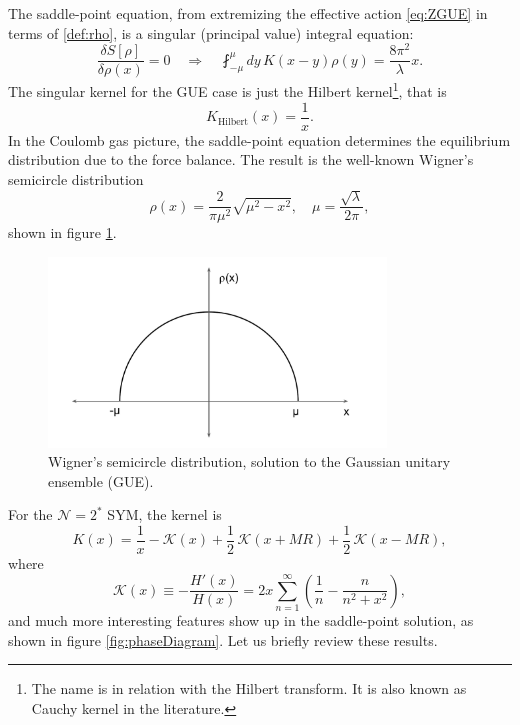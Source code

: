 The saddle-point equation, from extremizing the effective action \eqref{eq:ZGUE} in terms of \eqref{def:rho}, 
is a singular (principal value) integral equation:
\begin{equation} \label{saddlepointEq}
 \dfrac{\delta S [\rho]}{\delta \rho(x)} = 0 \quad
 \Rightarrow \quad
 \fint_{-\mu}^\mu dy \, K(x-y) \rho(y) = \dfrac{8\pi^2}{\lambda}x.
\end{equation}
The singular kernel for the GUE case is just the Hilbert kernel\footnote{
The name is in relation with the Hilbert transform. 
It is also known as Cauchy kernel in the literature.},
that is 
\begin{equation}
 K_\text{Hilbert}(x)=\dfrac{1}{x}.
\end{equation}
In the Coulomb gas picture, the saddle-point equation determines the equilibrium distribution due to the force balance.
The result is the well-known Wigner's semicircle distribution
\begin{equation}\label{semicircle}
 \rho(x) = \dfrac{2}{\pi \mu^2} \sqrt{\mu^2-x^2}, 
 \quad \mu = \dfrac{\sqrt{\lambda}}{2\pi},
\end{equation}
shown in figure \ref{fig:semicircle}.


\begin{figure}[t]
\begin{center}
 \centerline{\includegraphics[width=0.8\textwidth]{Images/semicircle.pdf}}
 \caption{\label{fig:semicircle} Wigner's semicircle distribution, solution to the Gaussian unitary ensemble (GUE).}
\end{center}
\end{figure}

For the $\mathcal{N}=2^*$ SYM, the kernel is
\begin{equation}
 K(x)=\dfrac{1}{x}-\mathcal{K}(x)+\dfrac{1}{2}\,\mathcal{K}(x+MR)+\dfrac{1}{2}\,\mathcal{K}(x-MR),
\end{equation}
where 
\begin{equation}
 \mathcal{K}(x) \equiv -\dfrac{H'(x)}{H(x)} 
                = 2x\sum_{n=1}^{\infty} \left(\dfrac{1}{n}-\dfrac{n}{n^2+x^2} \right),
\end{equation}
and much more interesting features show up in the saddle-point solution, as shown in figure \ref{fig:phaseDiagram}.
Let us briefly review these results.


